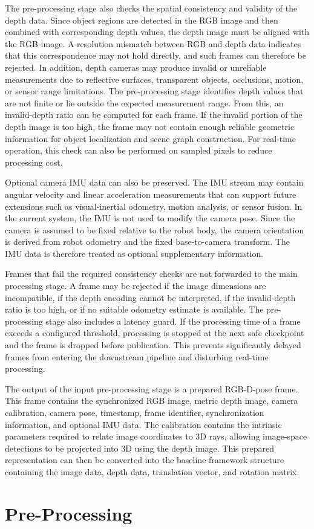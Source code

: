 The pre-processing stage also checks the spatial consistency and validity of the depth data. Since object regions are detected in the RGB image and then combined with corresponding depth values, the depth image must be aligned with the RGB image. A resolution mismatch between RGB and depth data indicates that this correspondence may not hold directly, and such frames can therefore be rejected. In addition, depth cameras may produce invalid or unreliable measurements due to reflective surfaces, transparent objects, occlusions, motion, or sensor range limitations. The pre-processing stage identifies depth values that are not finite or lie outside the expected measurement range. From this, an invalid-depth ratio can be computed for each frame. If the invalid portion of the depth image is too high, the frame may not contain enough reliable geometric information for object localization and scene graph construction. For real-time operation, this check can also be performed on sampled pixels to reduce processing cost.

Optional camera IMU data can also be preserved. The IMU stream may contain angular velocity and linear acceleration measurements that can support future extensions such as visual-inertial odometry, motion analysis, or sensor fusion. In the current system, the IMU is not used to modify the camera pose. Since the camera is assumed to be fixed relative to the robot body, the camera orientation is derived from robot odometry and the fixed base-to-camera transform. The IMU data is therefore treated as optional supplementary information.

Frames that fail the required consistency checks are not forwarded to the main processing stage. A frame may be rejected if the image dimensions are incompatible, if the depth encoding cannot be interpreted, if the invalid-depth ratio is too high, or if no suitable odometry estimate is available. The pre-processing stage also includes a latency guard. If the processing time of a frame exceeds a configured threshold, processing is stopped at the next safe checkpoint and the frame is dropped before publication. This prevents significantly delayed frames from entering the downstream pipeline and disturbing real-time processing.

The output of the input pre-processing stage is a prepared RGB-D-pose frame. This frame contains the synchronized RGB image, metric depth image, camera calibration, camera pose, timestamp, frame identifier, synchronization information, and optional IMU data. The calibration contains the intrinsic parameters required to relate image coordinates to 3D rays, allowing image-space detections to be projected into 3D using the depth image. This prepared representation can then be converted into the baseline framework structure containing the image data, depth data, translation vector, and rotation matrix.











\section{Pre-Processing}

